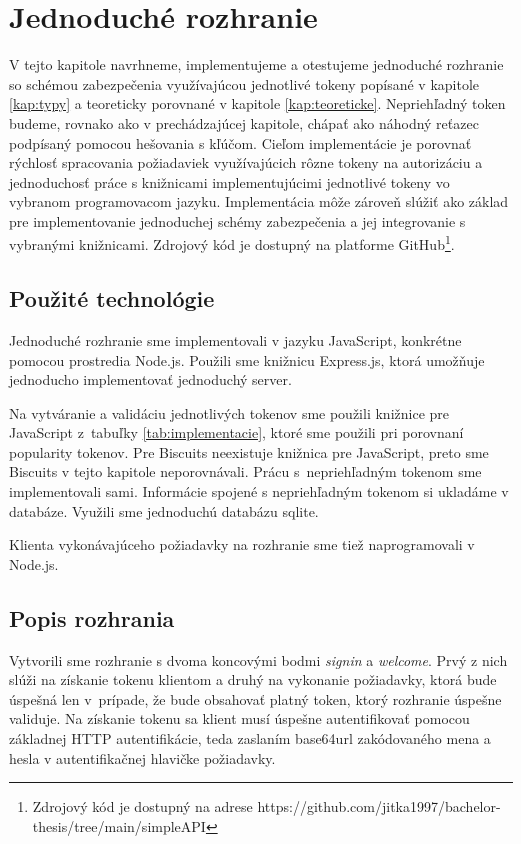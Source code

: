\chapter{Jednoduché rozhranie}

\label{kap:prakticke} %

V tejto kapitole navrhneme, implementujeme a otestujeme jednoduché rozhranie so schémou zabezpečenia využívajúcou jednotlivé tokeny popísané v kapitole \ref{kap:typy} a teoreticky porovnané v kapitole \ref{kap:teoreticke}. Nepriehľadný token budeme, rovnako ako v prechádzajúcej kapitole, chápať ako náhodný reťazec podpísaný pomocou hešovania s kľúčom. Cieľom implementácie je porovnať rýchlosť spracovania požiadaviek využívajúcich rôzne tokeny na autorizáciu a jednoduchosť práce s knižnicami implementujúcimi jednotlivé tokeny vo vybranom programovacom jazyku. Implementácia môže zároveň slúžiť ako základ pre implementovanie jednoduchej schémy zabezpečenia a jej integrovanie s vybranými knižnicami. Zdrojový kód je dostupný na platforme GitHub\footnote{Zdrojový kód je dostupný na adrese https://github.com/jitka1997/bachelor-thesis/tree/main/simpleAPI}.

\section{Použité technológie}

Jednoduché rozhranie sme implementovali v jazyku JavaScript, konkrétne pomocou prostredia Node.js. Použili sme knižnicu Express.js, ktorá umožňuje jednoducho implementovať jednoduchý server.

Na vytváranie a validáciu jednotlivých tokenov sme použili knižnice pre JavaScript z~tabuľky \ref{tab:implementacie}, ktoré sme použili pri porovnaní popularity tokenov. Pre Biscuits neexistuje knižnica pre JavaScript, preto sme Biscuits v tejto kapitole neporovnávali. Prácu s~nepriehľadným tokenom sme implementovali sami. Informácie spojené s nepriehľadným tokenom si ukladáme v databáze. Využili sme jednoduchú databázu sqlite.

Klienta vykonávajúceho požiadavky na rozhranie sme tiež naprogramovali v Node.js.

\section{Popis rozhrania}

Vytvorili sme rozhranie s dvoma koncovými bodmi \textit{signin} a \textit{welcome}. Prvý z nich slúži na získanie tokenu klientom a druhý na vykonanie požiadavky, ktorá bude úspešná len v~prípade, že bude obsahovať platný token, ktorý rozhranie úspešne validuje. Na získanie tokenu sa klient musí úspešne autentifikovať pomocou základnej HTTP autentifikácie, teda zaslaním base64url \cite{base64_rfc} zakódovaného mena a hesla v autentifikačnej hlavičke požiadavky.

